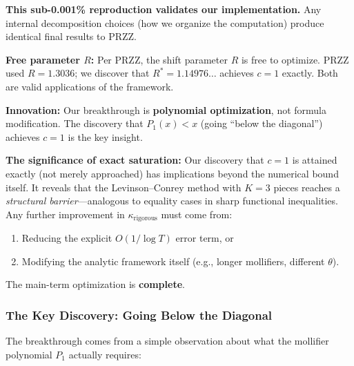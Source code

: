 \documentclass[11pt]{article}
\begin{document}
\textbf{This sub-0.001\% reproduction validates our implementation.} Any internal decomposition choices (how we organize the computation) produce identical final results to PRZZ.

\textbf{Free parameter $R$:} Per PRZZ, the shift parameter $R$ is free to optimize. PRZZ used $R = 1.3036$; we discover that $R^* = 1.14976\ldots$ achieves $c = 1$ exactly. Both are valid applications of the framework.

\textbf{Innovation:} Our breakthrough is \textbf{polynomial optimization}, not formula modification. The discovery that $P_1(x) < x$ (going ``below the diagonal'') achieves $c = 1$ is the key insight.

\textbf{The significance of exact saturation:} Our discovery that $c = 1$ is
attained exactly (not merely approached) has implications beyond the numerical
bound itself. It reveals that the Levinson--Conrey method with $K=3$ pieces
reaches a \emph{structural barrier}---analogous to equality cases in sharp
functional inequalities. Any further improvement in $\kappa_{\text{rigorous}}$
must come from:
\begin{enumerate}
\item Reducing the explicit $O(1/\log T)$ error term, or
\item Modifying the analytic framework itself (e.g., longer mollifiers, different $\theta$).
\end{enumerate}
The main-term optimization is \textbf{complete}.

\subsubsection{The Key Discovery: Going Below the Diagonal}

The breakthrough comes from a simple observation about what the mollifier polynomial $P_1$ actually requires:

\begin{center}
\end{center}
\end{document}

